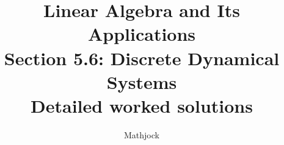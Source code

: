 
\title{\textbf{Linear Algebra and Its Applications}\\[0.3em]Section 5.6: Discrete Dynamical Systems\\[0.3em]\large Detailed worked solutions}
\author{Mathjock}
\date{}

\maketitle
\bookinfo
\tableofcontents
\clearpage
\renewcommand{\thesection}{5.\arabic{section}}
\renewcommand{\theHsection}{5.\arabic{section}}
\setcounter{section}{5}


